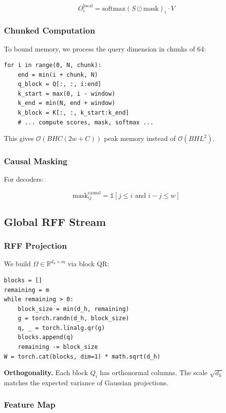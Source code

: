 \[
O_i^\text{local} = \text{softmax}(S \odot \text{mask})_i \cdot V
\tag{4.2}
\]

\subsubsection{Chunked Computation}

To bound memory, we process the query dimension in chunks of 64:

\begin{lstlisting}
for i in range(0, N, chunk):
    end = min(i + chunk, N)
    q_block = Q[:, :, i:end]
    k_start = max(0, i - window)
    k_end = min(N, end + window)
    k_block = K[:, :, k_start:k_end]
    # ... compute scores, mask, softmax ...
\end{lstlisting}

This gives $\mathcal{O}(B H C (2w + C))$ peak memory instead of 
$\mathcal{O}(B H L^2)$.

\subsubsection{Causal Masking}

For decoders:

\[
\text{mask}_{ij}^\text{causal} = \mathbb{1}[j \leq i \text{ and } i - j \leq w]
\tag{4.3}
\]

\subsection{Global RFF Stream}

\subsubsection{RFF Projection}

We build $\Omega \in \mathbb{R}^{d_h \times m}$ via block QR:

\begin{lstlisting}
blocks = []
remaining = m
while remaining > 0:
    block_size = min(d_h, remaining)
    g = torch.randn(d_h, block_size)
    q, _ = torch.linalg.qr(g)
    blocks.append(q)
    remaining -= block_size
W = torch.cat(blocks, dim=1) * math.sqrt(d_h)
\end{lstlisting}

\textbf{Orthogonality.} Each block $Q_i$ has orthonormal columns. The scale 
$\sqrt{d_h}$ matches the expected variance of Gaussian projections.

\subsubsection{Feature Map}

